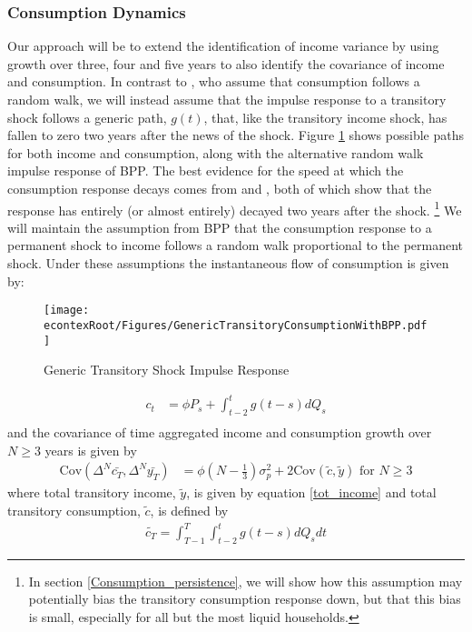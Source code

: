 \documentclass[titlepage]{\econtex}\newcommand{\texname}{ConsumptionHeterogeneity}
\begin{document}
	\subsubsection{Consumption Dynamics} \label{cons_dynamics}
	Our approach will be to extend the identification of income variance by using growth over three, four and five years to also identify the covariance of income and consumption. In contrast to \cite{blundell_consumption_2008}, who assume that consumption follows a random walk, we will instead assume that the impulse response to a transitory shock follows a generic path, $g(t)$, that, like the transitory income shock, has fallen to zero two years after the news of the shock. Figure \ref{fig:GenericTransitoryBPP} shows possible paths for both income and consumption, along with the alternative random walk impulse response of BPP. The best evidence for the speed at which the consumption response decays comes from \cite{gelman_what_2016} and \cite{fagereng_mpc_2016}, both of which show that the response has entirely (or almost entirely) decayed two years after the shock. \footnote{In section \ref{Consumption_persistence}, we will show how this assumption may potentially bias the transitory consumption response down, but that this bias is small, especially for all but the most liquid households.} We will maintain the assumption from BPP that the consumption response to a permanent shock to income follows a random walk proportional to the permanent shock. Under these assumptions the instantaneous flow of consumption is given by:	\begin{figure} 
		\begin{centering}
			\texttt{[image: \\econtexRoot/Figures/GenericTransitoryConsumptionWithBPP.pdf]} 
			\caption{Generic Transitory Shock Impulse Response}
			\label{fig:GenericTransitoryBPP}
		\end{centering}
	\end{figure}
	\begin{align*}
	c_t  &= \phi P_s  + \int_{t-2}^{t} g(t-s)dQ_s  \\
	\end{align*}
	and the covariance of time aggregated income and consumption growth over $N \geq 3$ years is given by
	\begin{align}
	\mathrm{Cov}(\Delta^N \bar{c_T},\Delta^N \bar{y_T} ) &= \phi (N-\frac{1}{3}) \sigma^2_p + 2 \mathrm{Cov}(\tilde{c},\tilde{y}) \text{  for  } N\geq 3 \label{covariance}
	\end{align}
	where total transitory income, $\tilde{y}$, is given by equation \ref{tot_income} and total transitory consumption, $\tilde{c}$, is defined by
	\begin{align}
	\tilde{c_T} = \int_{T-1}^{T}\int_{t-2}^{t} g(t-s)dQ_s dt \label{tot_cons}
	\end{align}
	
\end{document}
